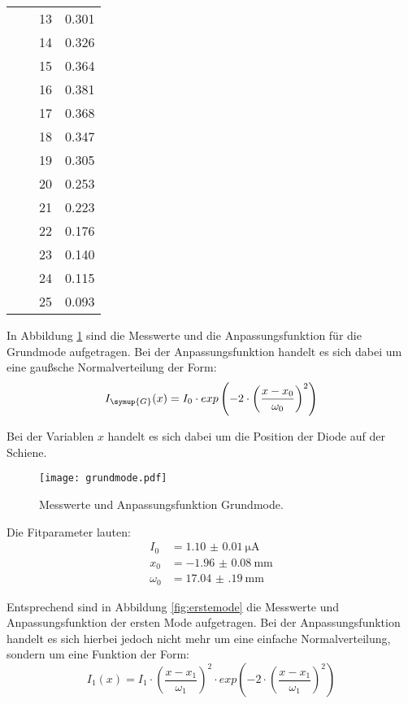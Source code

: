 \begin{table}[H]
\begin{tabular}{S S S S}
       &       &    13  & 0.301 \\
       &       &    14  & 0.326 \\
       &       &    15  & 0.364 \\
       &       &    16  & 0.381 \\
       &       &    17  & 0.368 \\
       &       &    18  & 0.347 \\
       &       &    19  & 0.305 \\
       &       &    20  & 0.253 \\
       &       &    21  & 0.223 \\
       &       &    22  & 0.176 \\
       &       &    23  & 0.140 \\
       &       &    24  & 0.115 \\
       &       &    25  & 0.093 \\
    \bottomrule
  \end{tabular}
\end{table}

In Abbildung \ref{fig:grundmode} sind die Messwerte und die Anpassungsfunktion
für die Grundmode aufgetragen. Bei der Anpassungsfunktion handelt es sich dabei
um eine gaußsche Normalverteilung der Form:
\begin{equation*}
  I_\symup{G}(x) = I_0 \cdot exp\left(-2 \cdot \left(\frac{x - x_0}{\omega_0}\right)^2\right)
\end{equation*}

Bei der Variablen $x$ handelt es sich dabei um die Position der Diode auf der Schiene.

\begin{figure}[H]
  \centering
  \texttt{[image: grundmode.pdf]}
  \caption{Messwerte und Anpassungsfunktion Grundmode.}
  \label{fig:grundmode}
\end{figure}

Die Fitparameter lauten:
\begin{align*}
  I_0 &= \SI{1.10(1)}{\micro\ampere} \\
  x_0 &= \SI{-1.96(8)}{\milli\meter} \\
  \omega_0 &= \SI{17.04(19)}{\milli\meter}
\end{align*}

Entsprechend sind in Abbildung \ref{fig:erstemode} die Messwerte und Anpassungsfunktion
der ersten Mode aufgetragen. Bei der Anpassungsfunktion handelt es sich hierbei jedoch
nicht mehr um eine einfache Normalverteilung, sondern um eine Funktion der Form:
\begin{equation*}
  I_{1}(x) = I_1 \cdot \left(\frac{x - x_1}{\omega_1}\right)^2 \cdot exp\left(-2 \cdot \left(\frac{x - x_1}{\omega_1}\right)^2\right)
\end{equation*}

